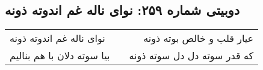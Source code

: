 \begin{center}
\section*{دوبیتی شماره ۲۵۹: نوای ناله غم اندوته ذونه}
\label{sec:259}
\begin{longtable}{l p{0.5cm} r}
نوای ناله غم اندوته ذونه
&&
عیار قلب و خالص بوته ذونه
\\
بیا سوته دلان با هم بنالیم
&&
که قدر سوته دل دل سوته ذونه
\\
\end{longtable}
\end{center}
